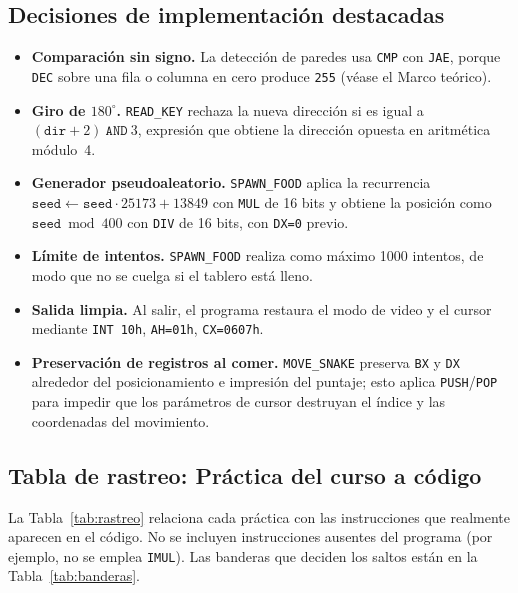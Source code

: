 \documentclass[10pt]{article}
\begin{document}
\subsection{Decisiones de implementación destacadas}
\begin{itemize}[leftmargin=*]
  \item \textbf{Comparación sin signo.} La detección de paredes usa \texttt{CMP} con \texttt{JAE}, porque \texttt{DEC} sobre una fila o columna en cero produce \texttt{255} (véase el Marco teórico).
  \item \textbf{Giro de $180^\circ$.} \texttt{READ\_KEY} rechaza la nueva dirección si es igual a $(\texttt{dir}+2)\ \texttt{AND}\ 3$, expresión que obtiene la dirección opuesta en aritmética módulo~4.
  \item \textbf{Generador pseudoaleatorio.} \texttt{SPAWN\_FOOD} aplica la recurrencia $\texttt{seed}\leftarrow \texttt{seed}\cdot 25173+13849$ con \texttt{MUL} de 16 bits y obtiene la posición como $\texttt{seed}\bmod 400$ con \texttt{DIV} de 16 bits, con \texttt{DX=0} previo.
  \item \textbf{Límite de intentos.} \texttt{SPAWN\_FOOD} realiza como máximo 1000 intentos, de modo que no se cuelga si el tablero está lleno.
  \item \textbf{Salida limpia.} Al salir, el programa restaura el modo de video y el cursor mediante \texttt{INT 10h}, \texttt{AH=01h}, \texttt{CX=0607h}.
    \item \textbf{Preservación de registros al comer.} \texttt{MOVE\_SNAKE} preserva \texttt{BX} y \texttt{DX} alrededor del posicionamiento e impresión del puntaje; esto aplica \texttt{PUSH}/\texttt{POP} para impedir que los parámetros de cursor destruyan el índice y las coordenadas del movimiento.
\end{itemize}

\subsection{Tabla de rastreo: Práctica del curso a código}
La Tabla~\ref{tab:rastreo} relaciona cada práctica con las instrucciones que realmente aparecen en el código. No se incluyen instrucciones ausentes del programa (por ejemplo, no se emplea \texttt{IMUL}). Las banderas que deciden los saltos están en la Tabla~\ref{tab:banderas}.
\end{document}

